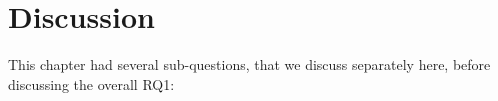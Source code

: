 




\section{\statusgreen Discussion}
\label{sec:cgs_findings}



This chapter had several sub-questions, that we discuss separately here, before discussing the overall RQ1:


